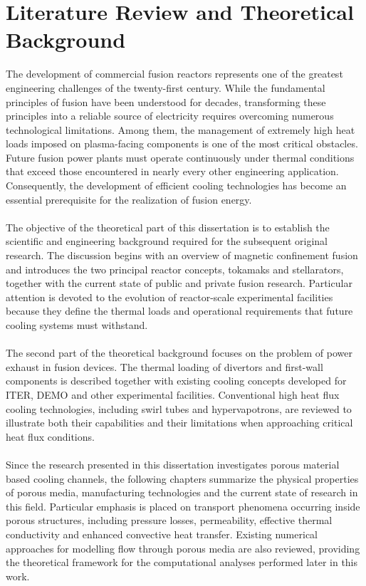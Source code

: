 \documentclass[a4paper]{article}
\begin{document}
\part{Literature Review and Theoretical Background}
The development of commercial fusion reactors represents one of the greatest engineering challenges of the twenty-first century. While the fundamental principles of fusion have been understood for decades, transforming these principles into a reliable source of electricity requires overcoming numerous technological limitations. Among them, the management of extremely high heat loads imposed on plasma-facing components is one of the most critical obstacles. Future fusion power plants must operate continuously under thermal conditions that exceed those encountered in nearly every other engineering application. Consequently, the development of efficient cooling technologies has become an essential prerequisite for the realization of fusion energy.
\\
\\
The objective of the theoretical part of this dissertation is to establish the scientific and engineering background required for the subsequent original research. The discussion begins with an overview of magnetic confinement fusion and introduces the two principal reactor concepts, tokamaks and stellarators, together with the current state of public and private fusion research. Particular attention is devoted to the evolution of reactor-scale experimental facilities because they define the thermal loads and operational requirements that future cooling systems must withstand.
\\
\\
The second part of the theoretical background focuses on the problem of power exhaust in fusion devices. The thermal loading of divertors and first-wall components is described together with existing cooling concepts developed for ITER, DEMO and other experimental facilities. Conventional high heat flux cooling technologies, including swirl tubes and hypervapotrons, are reviewed to illustrate both their capabilities and their limitations when approaching critical heat flux conditions.
\\
\\
Since the research presented in this dissertation investigates porous material based cooling channels, the following chapters summarize the physical properties of porous media, manufacturing technologies and the current state of research in this field. Particular emphasis is placed on transport phenomena occurring inside porous structures, including pressure losses, permeability, effective thermal conductivity and enhanced convective heat transfer. Existing numerical approaches for modelling flow through porous media are also reviewed, providing the theoretical framework for the computational analyses performed later in this work.
\end{document}
